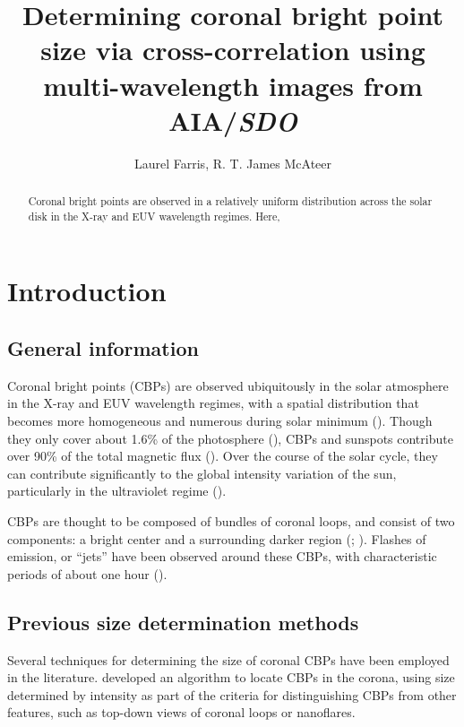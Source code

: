 \documentclass[preprint]{aastex}   %
\begin{document}
\title{Determining coronal bright point size via cross-correlation using
multi-wavelength images from AIA/\textit{SDO}}
\author{Laurel Farris, R. T. James McAteer}

\begin{abstract}
Coronal bright points are observed in a relatively uniform distribution across the
solar disk in the X-ray and EUV wavelength regimes.
Here,
\end{abstract}

\section{Introduction}\label{intro}


\subsection{General information}
Coronal bright points (CBPs)
are observed ubiquitously in the solar atmosphere in the X-ray and EUV
wavelength regimes, with a spatial distribution that becomes more homogeneous
and numerous during solar minimum (\cite{Priest}).
Though they only cover about 1.6\% of the
photosphere (\cite{Srivastava}), CBPs and sunspots
contribute over 90\% of the total magnetic flux (\cite{Howard}).
Over the course of the solar cycle, they can contribute significantly to the
global intensity variation of the sun, particularly in the ultraviolet
regime (\cite{Riethmuller}).

CBPs are thought to be composed of bundles of coronal loops, and
consist of two components: a bright center and a surrounding darker
region (\cite{Zhang}; \cite{Alipour}).
Flashes of emission, or ``jets'' have been observed around these CBPs, with
characteristic periods of about one hour (\cite{Zhang}).

\subsection{Previous size determination methods}
Several techniques for determining the size of coronal CBPs have been employed
in the literature.
\cite{Alipour}
developed an algorithm to locate CBPs in the corona, using size determined
by intensity as part of the criteria for distinguishing CBPs from other features,
such as top-down views of coronal loops or nanoflares.
\end{document}
